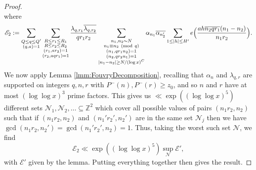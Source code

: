 \documentclass[10pt]{amsart}
\theoremstyle{plain}
\numberwithin{equation}{section}
\newcommand{\Mod}[1]{\ (\mathrm{mod}\ #1)}
\begin{document}
\begin{proof}
\[\]
where
\[
\mathscr{E}_2:=\sum_{\substack{Q\le q\le Q'\\ (q,a)=1}}\sum_{\substack{R\le r_1\le  R_1\\ R\le r_2\le R_2\\ (r_1,a r_2)=1\\ (r_2,a q r_1)=1}}\frac{\lambda_{q,r_1}\overline{\lambda_{q,r_2}}}{q r_1 r_2}\sum_{\substack{n_1,n_2\sim N\\ n_1\equiv n_2\Mod{q}\\ (n_1,qr_1n_2)=1\\ (n_2,qr_2n_1)=1\\ |n_1-n_2|\ge N/(\log{x})^C}}\alpha_{n_1}\overline{\alpha_{n_2'}}\sum_{1\le |h| \le H'} e\Bigl(\frac{ ah\overline{n_2 q r_1}(n_1-n_2)}{n_1 r_2}\Bigr).
\]
We now apply Lemma \ref{lmm:FouvryDecomposition}, recalling that $\alpha_n$ and $\lambda_{q,r}$ are supported on integers $q,n,r$ with $P^-(n),P^-(r)\ge z_0$, and so $n$ and $r$ have at most $(\log\log{x})^3$ prime factors. This gives us $\ll \exp((\log\log{x})^5)$ different sets $\mathcal{N}_1,\mathcal{N}_2,\dots\subseteq \mathbb{Z}^2$ which cover all possible values of pairs $(n_1r_2,n_2)$ such that if $(n_1r_2,n_2)$ and $(n_1'r_2',n_2')$ are in the same set $\mathcal{N}_j$ then we have $\gcd(n_1r_2,n_2')=\gcd(n_1'r_2',n_2)=1$. Thus, taking the worst such set $\mathcal{N}$, we find
\[
\mathscr{E}_2\ll \exp((\log\log{x})^5)\sup_{\mathcal{N}}\mathscr{E}',
\]
with $\mathscr{E}'$ given by the lemma. Putting everything together then gives the result.
\end{proof}
%
%
%
%
%
%
%
%
%
%
%
%
%
%
%
%
%
%
\end{document}
